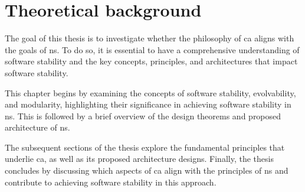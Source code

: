 \chapter{Theoretical background} \label{chap:theoreticalbackground} 

The goal of this thesis is to investigate whether the philosophy of \gls{ca}
aligns with the goals of \gls{ns}. To do so, it is essential to have a
comprehensive understanding of software stability and the key concepts, principles, and
architectures that impact software stability.

This chapter begins by examining the concepts of software stability, evolvability, and
modularity, highlighting their significance in achieving software stability in \gls{ns}.
This is followed by a brief overview of the design theorems and proposed architecture of
\gls{ns}.

The subsequent sections of the thesis explore the fundamental principles that underlie
\gls{ca}, as well as its proposed architecture designs. Finally, the thesis
concludes by discussing which aspects of \gls{ca} align with the principles of
\gls{ns} and contribute to achieving software stability in this approach.





















